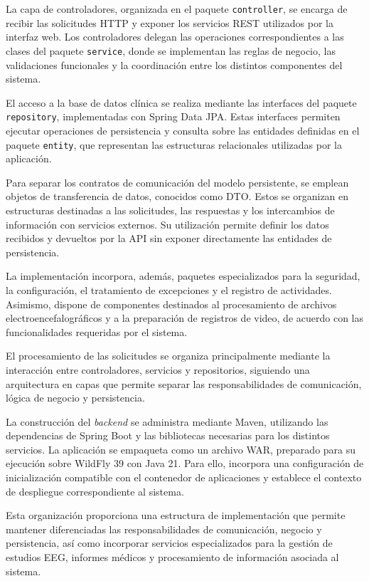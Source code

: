 La capa de controladores, organizada en el paquete
\texttt{controller}, se encarga de recibir las
solicitudes HTTP y exponer los servicios REST
utilizados por la interfaz web. Los controladores
delegan las operaciones correspondientes a las
clases del paquete \texttt{service}, donde se
implementan las reglas de negocio, las validaciones
funcionales y la coordinación entre los distintos
componentes del sistema.

El acceso a la base de datos clínica se realiza
mediante las interfaces del paquete
\texttt{repository}, implementadas con Spring Data
JPA. Estas interfaces permiten ejecutar operaciones
de persistencia y consulta sobre las entidades
definidas en el paquete \texttt{entity}, que
representan las estructuras relacionales utilizadas
por la aplicación.

Para separar los contratos de comunicación del
modelo persistente, se emplean objetos de
transferencia de datos, conocidos como DTO.
Estos se organizan en estructuras destinadas
a las solicitudes, las respuestas y los
intercambios de información con servicios
externos. Su utilización permite definir
los datos recibidos y devueltos por la API
sin exponer directamente las entidades de
persistencia.

La implementación incorpora, además, paquetes
especializados para la seguridad, la configuración,
el tratamiento de excepciones y el registro de
actividades. Asimismo, dispone de componentes
destinados al procesamiento de archivos
electroencefalográficos y a la preparación
de registros de video, de acuerdo con las
funcionalidades requeridas por el sistema.


El procesamiento de las solicitudes se organiza
principalmente mediante la interacción entre controladores,
servicios y repositorios, siguiendo una arquitectura
en capas que permite separar las responsabilidades
de comunicación, lógica de negocio y persistencia.


La construcción del \textit{backend} se administra
mediante Maven, utilizando las dependencias
de Spring Boot y las bibliotecas necesarias
para los distintos servicios. La aplicación
se empaqueta como un archivo WAR, preparado
para su ejecución sobre WildFly 39 con Java 21.
Para ello, incorpora una configuración de
inicialización compatible con el contenedor
de aplicaciones y establece el contexto
de despliegue correspondiente al sistema.

Esta organización proporciona una estructura
de implementación que permite mantener
diferenciadas las responsabilidades de
comunicación, negocio y persistencia, así
como incorporar servicios especializados
para la gestión de estudios EEG, informes
médicos y procesamiento de información
asociada al sistema.



